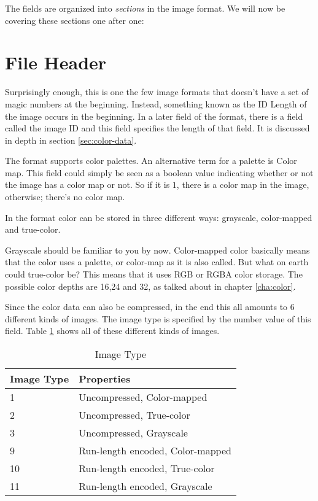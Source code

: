 \begin{refsection}
  The fields are organized into \textit{sections} in
  the image format. We will now be covering these sections one after
  one:

  \section{File Header}


  Surprisingly enough, this is one the few image formats that doesn't
  have a set of magic numbers at the beginning. Instead, something
  known as the ID Length of the image occurs in the beginning. In a
  later field of the format, there is a field called the image
  ID and this field specifies the length of that field. It is discussed
  in depth in section \ref{sec:color-data}.


  The \tga format supports color palettes. An alternative term for a
  palette is Color map. This field could simply be
  seen as a boolean value indicating whether or not the image has a color
  map or not. So if it is $1$, there is a color map in the
  image, otherwise; there's no color map.


  In the \tga format color can be stored in three different ways:
  grayscale, color-mapped and
  true-color.

  Grayscale should be familiar to you by now. Color-mapped color
  basically means that the color uses a palette, or color-map as it is
  also called. But what on earth could true-color be? This means that
  it uses RGB or RGBA color storage. The possible color depths are
  16,24 and 32, as talked about in chapter \ref{cha:color}.

  Since the color data can also be compressed, in the end this all
  amounts to $6$ different kinds of images. The image type is
  specified by the number value of this field. Table \ref{tab:imgtype}
  shows all of these different kinds of images.

  \begin{table}
    \centering
    \begin{tabular}{ll}
      \toprule
      Image Type & Properties \\
      \midrule
      1 & Uncompressed, Color-mapped \\
      2 & Uncompressed, True-color \\
      3 & Uncompressed, Grayscale\\
      9 & Run-length encoded, Color-mapped \\
      10 & Run-length encoded, True-color \\
      11 & Run-length encoded, Grayscale\\
      \bottomrule
    \end{tabular}
    \caption{Image Type}
    \label{tab:imgtype}
  \end{table}


\end{refsection}

